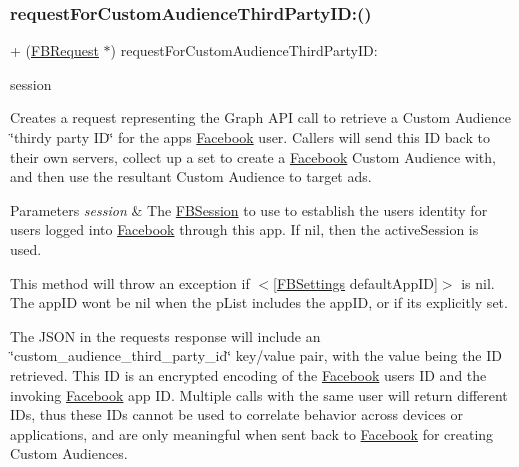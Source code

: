 \subsubsection{\texorpdfstring{request\+For\+Custom\+Audience\+Third\+Party\+I\+D\+:()}{requestForCustomAudienceThirdPartyID:()}\hspace{0.1cm}{\footnotesize\ttfamily [3/5]}}
{\footnotesize\ttfamily + (\hyperlink{interfaceFBRequest}{F\+B\+Request} $\ast$) request\+For\+Custom\+Audience\+Third\+Party\+I\+D\+: \begin{DoxyParamCaption}\item[{(\hyperlink{interfaceFBSession}{F\+B\+Session} $\ast$)}]{session }\end{DoxyParamCaption}}

Creates a request representing the Graph A\+PI call to retrieve a Custom Audience \char`\"{}thirdy party I\+D\char`\"{} for the app\textquotesingle{}s \hyperlink{interfaceFacebook}{Facebook} user. Callers will send this ID back to their own servers, collect up a set to create a \hyperlink{interfaceFacebook}{Facebook} Custom Audience with, and then use the resultant Custom Audience to target ads.


\begin{DoxyParams}{Parameters}
{\em session} & The \hyperlink{interfaceFBSession}{F\+B\+Session} to use to establish the user\textquotesingle{}s identity for users logged into \hyperlink{interfaceFacebook}{Facebook} through this app. If {\ttfamily nil}, then the active\+Session is used.\\
\hline
\end{DoxyParams}
This method will throw an exception if $<$\mbox{[}\hyperlink{interfaceFBSettings}{F\+B\+Settings} default\+App\+ID\mbox{]}$>$ is {\ttfamily nil}. The app\+ID won\textquotesingle{}t be nil when the p\+List includes the app\+ID, or if it\textquotesingle{}s explicitly set.

The J\+S\+ON in the request\textquotesingle{}s response will include an \char`\"{}custom\+\_\+audience\+\_\+third\+\_\+party\+\_\+id\char`\"{} key/value pair, with the value being the ID retrieved. This ID is an encrypted encoding of the \hyperlink{interfaceFacebook}{Facebook} user\textquotesingle{}s ID and the invoking \hyperlink{interfaceFacebook}{Facebook} app ID. Multiple calls with the same user will return different I\+Ds, thus these I\+Ds cannot be used to correlate behavior across devices or applications, and are only meaningful when sent back to \hyperlink{interfaceFacebook}{Facebook} for creating Custom Audiences.

